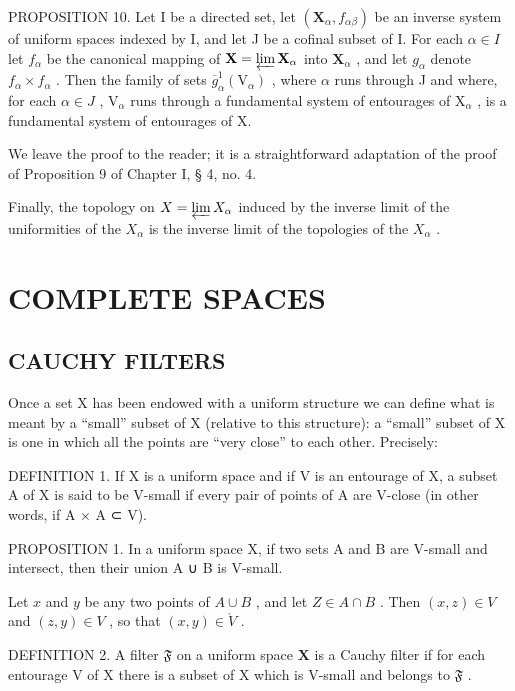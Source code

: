 PROPOSITION 10. Let I be a directed set, let \((\mathbf{X}_{\alpha}, f_{\alpha \beta})\) be an inverse system of uniform spaces indexed by I, and let J be a cofinal subset of I. For each \(\alpha \in I\) let \(f_{\alpha}\) be the canonical mapping of \(\mathbf{X} = \varprojlim \mathbf{X}_{\alpha}\) into \(\mathbf{X}_{\alpha}\) , and let \(g_{\alpha}\) denote \(f_{\alpha} \times f_{\alpha}\) . Then the family of sets \(\overline{g}_{\alpha}^{1}(\mathrm{V}_{\alpha})\) , where \(\alpha\) runs through J and where, for each \(\alpha \in J\) , \(\mathrm{V}_{\alpha}\) runs through a fundamental system of entourages of \(\mathrm{X}_{\alpha}\) , is a fundamental system of entourages of X.

We leave the proof to the reader; it is a straightforward adaptation of the proof of Proposition 9 of Chapter I, § 4, no. 4.

Finally, the topology on \(X = \varprojlim X_{\alpha}\) induced by the inverse limit of the uniformities of the \(X_{\alpha}\) is the inverse limit of the topologies of the \(X_{\alpha}\) .

\section{COMPLETE SPACES}

\subsection{CAUCHY FILTERS}

Once a set X has been endowed with a uniform structure we can define what is meant by a ``small'' subset of X (relative to this structure): a ``small'' subset of X is one in which all the points are ``very close'' to each other. Precisely:

DEFINITION 1. If X is a uniform space and if V is an entourage of X, a subset A of X is said to be V-small if every pair of points of A are V-close (in other words, if A × A ⊂ V).

PROPOSITION 1. In a uniform space X, if two sets A and B are V-small and intersect, then their union A ∪ B is V-small.

Let \(x\) and \(y\) be any two points of \(A \cup B\) , and let \(Z \in A \cap B\) . Then \((x, z) \in V\) and \((z, y) \in V\) , so that \((x, y) \in \mathring{V}\) .

DEFINITION 2. A filter \(\mathfrak{F}\) on a uniform space \(\mathbf{X}\) is a Cauchy filter if for each entourage V of X there is a subset of X which is V-small and belongs to \(\mathfrak{F}\) .

